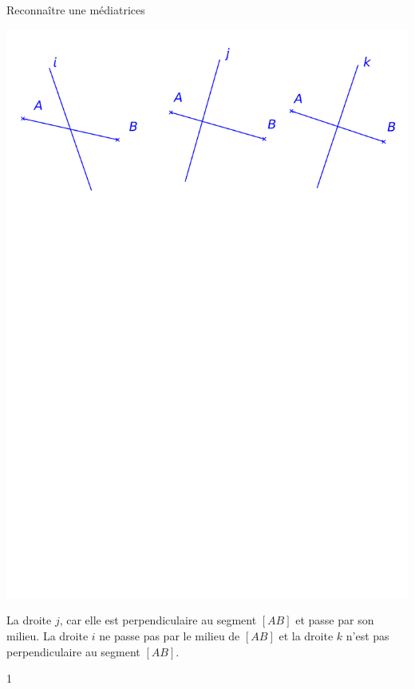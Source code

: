 \documentclass[a4paper,11pt]{report}
\begin{document}
\begin{resolu}{Reconnaître une médiatrices}
{\vspace{-0.8cm}
\begin{center}	
\includegraphics[scale=0.5]{media/es-10/12-5}
\end{center}
\vspace{-2cm}
La droite $j$, car elle est perpendiculaire au segment $[AB]$ et passe par son milieu. La droite $i$ ne passe pas par le milieu de $[AB]$ et la droite $k$ n'est pas perpendiculaire au segment $[AB]$.
}
{1}
\end{resolu}
\end{document}
